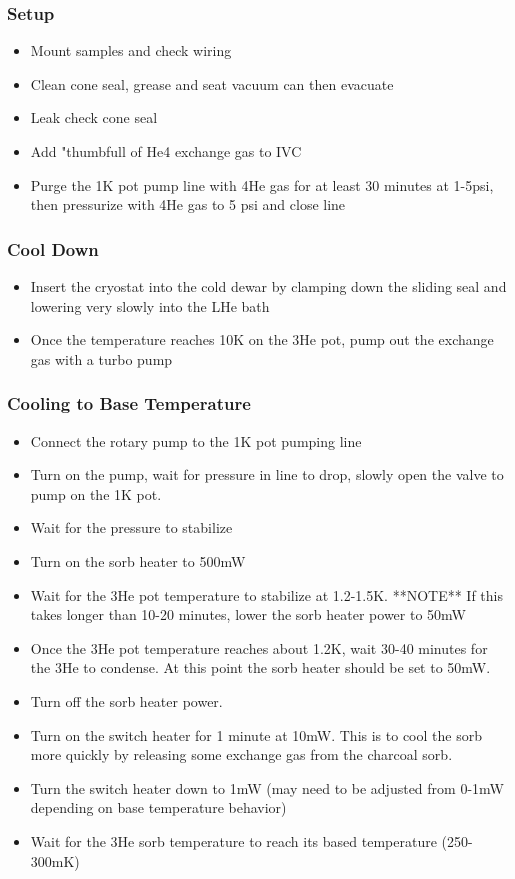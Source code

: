 \subsubsection*{Setup}

\begin{itemize}
\item Mount samples and check wiring
\item Clean cone seal, grease and seat vacuum can then evacuate
\item Leak check cone seal
\item Add "thumbfull of He4 exchange gas to IVC
\item Purge the 1K pot pump line with 4He gas for at least 30 minutes at 1-5psi, then pressurize with 4He gas to 5 psi and close line
\end{itemize}

\subsubsection*{Cool Down}

\begin{itemize}
\item Insert the cryostat into the cold dewar by clamping down the sliding seal and lowering very slowly into the LHe bath
\item Once the temperature reaches 10K on the 3He pot, pump out the exchange gas with a turbo pump
\end{itemize}

\subsubsection*{Cooling to Base Temperature}

\begin{itemize}
\item Connect the rotary pump to the 1K pot pumping line
\item Turn on the pump, wait for pressure in line to drop, slowly open the valve to pump on the 1K pot.
\item Wait for the pressure to stabilize 
\item Turn on the sorb heater to 500mW
\item Wait for the 3He pot temperature to stabilize at 1.2-1.5K. 
**NOTE** If this takes longer than 10-20 minutes, lower the sorb heater power to 50mW
\item Once the 3He pot temperature reaches about 1.2K, wait 30-40 minutes for the 3He to condense. At this point the sorb heater should be set to 50mW.
\item Turn off the sorb heater power.
\item Turn on the switch heater for 1 minute at 10mW. This is to cool the sorb more quickly by releasing some exchange gas from the charcoal sorb.
\item Turn the switch heater down to 1mW (may need to be adjusted from 0-1mW depending on base temperature behavior)
\item Wait for the 3He sorb temperature to reach its based temperature (250-300mK)
\end{itemize}

